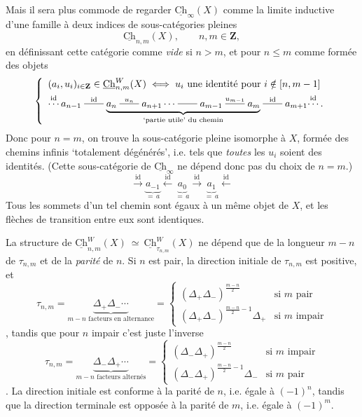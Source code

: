 \documentclass[11pt]{article}
\newcommand{\printedpage}[1]{\marginpar{\footnotesize p.~#1}}
\newcommand{\msp}[1]{\marginpar{\footnotesize [#1]}}
\newcommand{\Ch}{\underline{\mathrm{Ch}}}
\newcommand{\dashto}[1]{\mathrel{\overset{#1}{\rule[0.6ex]{2em}{0.4pt}}}}
\begin{document}
Mais il sera plus commode de regarder $\Ch_{\infty}(X)$ comme la limite inductive d'une
\msp{page 146}
famille à deux indices de sous-catégories pleines
\[
\Ch_{n,m}(X), \qquad n, m \in \mathbf{Z},
\]
en définissant cette catégorie comme \textit{vide} si $n > m$, et pour $n \leq m$ comme formée des objets
\[
\left\{ \begin{array}{l}
(a_i, u_i)_{i \in \mathbf{Z}} \in \Ch^{W}_{n,m}(X) \iff u_i \text{ une identité pour } i \notin [n, m-1] \\[1ex]
\overset{\mathrm{id}}{\cdots}\, a_{n-1} \dashto{\mathrm{id}} \underbrace{a_n \dashto{u_n} a_{n+1} \cdots \dashto{} a_{m-1} \dashto{u_{m-1}} a_m}_{\text{\scriptsize `partie utile' du chemin}} \dashto{\mathrm{id}} a_{m+1} \overset{\mathrm{id}}{\cdots}\,.
\end{array} \right.
\]
Donc pour $n = m$, on trouve la sous-catégorie pleine isomorphe à $X$, formée des chemins infinis `totalement dégénérés', i.e. tels que \textit{toutes} les $u_i$ soient des identités. (Cette sous-catégorie de $\Ch_{\infty}$ ne dépend donc pas du choix de $n = m$.)
\[
\xrightarrow{\mathrm{id}} \underbrace{a_{-1}}_{=\, a} \xleftarrow{\mathrm{id}} \underbrace{a_0}_{=\, a} \xrightarrow{\mathrm{id}} \underbrace{a_1}_{=\, a} \xleftarrow{\mathrm{id}}
\]
Tous les sommets d'un tel chemin sont égaux à un même objet de $X$, et les flèches de transition entre eux sont identiques.

La structure de $\Ch^{W}_{n,m}(X) \ \simeq \ \Ch^{W}_{\tau_{n,m}}(X)$ ne dépend que de la longueur $m-n$ de $\tau_{n,m}$ et de la \textit{parité} de $n$. Si $n$ est pair, la direction initiale de $\tau_{n,m}$ est positive, et
\[
\tau_{n,m} = \underbrace{\Delta_+ \Delta_- \cdots}_{m-n \text{ facteurs en alternance}} = \left\{ \begin{array}{ll}
(\Delta_+ \Delta_-)^{\frac{m-n}{2}} & \text{si } m \text{ pair} \\[1ex]
(\Delta_+ \Delta_-)^{\frac{m-n}{2}-1} \Delta_+ & \text{si } m \text{ impair}
\end{array} \right.
\]
, tandis que pour $n$ impair c'est juste l'inverse
\printedpage{92}
\msp{page 147}
\[
\tau_{n,m} = \underbrace{\Delta_- \Delta_+ \cdots}_{m-n \text{ facteurs alternés}} = \left\{ \begin{array}{ll}
(\Delta_- \Delta_+)^{\frac{m-n}{2}} & \text{si } m \text{ impair} \\[1ex]
(\Delta_- \Delta_+)^{\frac{m-n}{2}-1} \Delta_- & \text{si } m \text{ pair}
\end{array} \right.
\]
. La direction initiale est conforme à la parité de $n$, i.e. égale à $(-1)^n$, tandis que la direction terminale est opposée à la parité de $m$, i.e. égale à $(-1)^m$.
\end{document}
